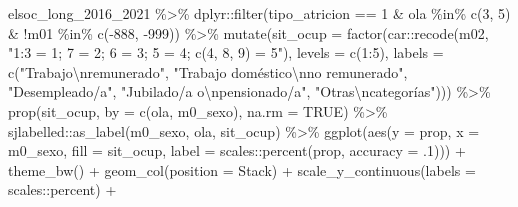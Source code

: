 \documentclass[
  12pt,
]{book}
\newenvironment{Shaded}{\begin{snugshade}}{\end{snugshade}}
\newcommand{\AttributeTok}[1]{\textcolor[rgb]{0.77,0.63,0.00}{#1}}
\newcommand{\ConstantTok}[1]{\textcolor[rgb]{0.00,0.00,0.00}{#1}}
\newcommand{\DecValTok}[1]{\textcolor[rgb]{0.00,0.00,0.81}{#1}}
\newcommand{\FunctionTok}[1]{\textcolor[rgb]{0.00,0.00,0.00}{#1}}
\newcommand{\NormalTok}[1]{#1}
\newcommand{\SpecialCharTok}[1]{\textcolor[rgb]{0.00,0.00,0.00}{#1}}
\newcommand{\StringTok}[1]{\textcolor[rgb]{0.31,0.60,0.02}{#1}}
\begin{document}
\begin{Shaded}
\begin{Highlighting}[]
\NormalTok{elsoc\_long\_2016\_2021 }\SpecialCharTok{\%\textgreater{}\%} 
\NormalTok{    dplyr}\SpecialCharTok{::}\FunctionTok{filter}\NormalTok{(tipo\_atricion }\SpecialCharTok{==} \DecValTok{1} 
                \SpecialCharTok{\&}\NormalTok{ ola }\SpecialCharTok{\%in\%} \FunctionTok{c}\NormalTok{(}\DecValTok{3}\NormalTok{, }\DecValTok{5}\NormalTok{) }\SpecialCharTok{\&} \SpecialCharTok{!}\NormalTok{m01 }\SpecialCharTok{\%in\%} \FunctionTok{c}\NormalTok{(}\SpecialCharTok{{-}}\DecValTok{888}\NormalTok{, }\SpecialCharTok{{-}}\DecValTok{999}\NormalTok{)) }\SpecialCharTok{\%\textgreater{}\%} 
  \FunctionTok{mutate}\NormalTok{(}\AttributeTok{sit\_ocup =} \FunctionTok{factor}\NormalTok{(car}\SpecialCharTok{::}\FunctionTok{recode}\NormalTok{(m02, }\StringTok{"1:3 = 1; 7 = 2; 6 = 3; 5 = 4; c(4, 8, 9) = 5"}\NormalTok{), }
                           \AttributeTok{levels =} \FunctionTok{c}\NormalTok{(}\DecValTok{1}\SpecialCharTok{:}\DecValTok{5}\NormalTok{),}
                           \AttributeTok{labels =} \FunctionTok{c}\NormalTok{(}\StringTok{"Trabajo}\SpecialCharTok{\textbackslash{}n}\StringTok{remunerado"}\NormalTok{, }\StringTok{"Trabajo doméstico}\SpecialCharTok{\textbackslash{}n}\StringTok{no remunerado"}\NormalTok{, }\StringTok{"Desempleado/a"}\NormalTok{, }\StringTok{"Jubilado/a o}\SpecialCharTok{\textbackslash{}n}\StringTok{pensionado/a"}\NormalTok{, }\StringTok{"Otras}\SpecialCharTok{\textbackslash{}n}\StringTok{categorías"}\NormalTok{))) }\SpecialCharTok{\%\textgreater{}\%}
  \FunctionTok{prop}\NormalTok{(sit\_ocup, }\AttributeTok{by =} \FunctionTok{c}\NormalTok{(ola, m0\_sexo), }\AttributeTok{na.rm =} \ConstantTok{TRUE}\NormalTok{) }\SpecialCharTok{\%\textgreater{}\%} 
\NormalTok{  sjlabelled}\SpecialCharTok{::}\FunctionTok{as\_label}\NormalTok{(m0\_sexo, ola, sit\_ocup) }\SpecialCharTok{\%\textgreater{}\%} 
  \FunctionTok{ggplot}\NormalTok{(}\FunctionTok{aes}\NormalTok{(}\AttributeTok{y =}\NormalTok{ prop, }\AttributeTok{x =}\NormalTok{ m0\_sexo, }\AttributeTok{fill =}\NormalTok{ sit\_ocup, }
             \AttributeTok{label =}\NormalTok{ scales}\SpecialCharTok{::}\FunctionTok{percent}\NormalTok{(prop, }\AttributeTok{accuracy =}\NormalTok{ .}\DecValTok{1}\NormalTok{))) }\SpecialCharTok{+} 
  \FunctionTok{theme\_bw}\NormalTok{() }\SpecialCharTok{+} 
  \FunctionTok{geom\_col}\NormalTok{(}\AttributeTok{position =} \StringTok{\textquotesingle{}Stack\textquotesingle{}}\NormalTok{) }\SpecialCharTok{+}
  \FunctionTok{scale\_y\_continuous}\NormalTok{(}\AttributeTok{labels =}\NormalTok{ scales}\SpecialCharTok{::}\NormalTok{percent) }\SpecialCharTok{+}

\end{Highlighting}
\end{Shaded}
\end{document}
